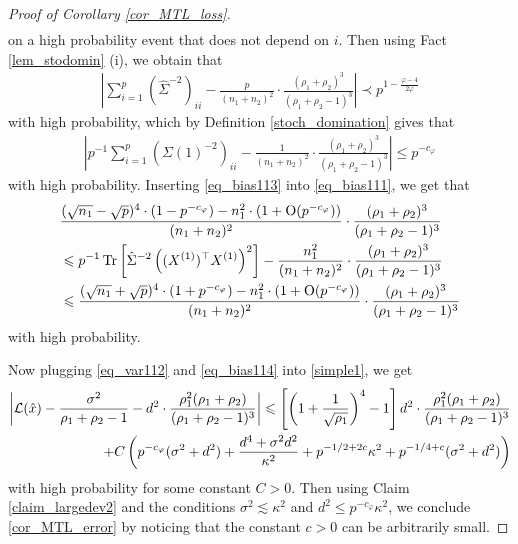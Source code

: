 \begin{proof}[Proof of Corollary \ref{cor_MTL_loss}]
\begin{align*}
\end{align*}
on a high probability event that does not depend on $i$. Then using Fact \ref{lem_stodomin} (i), we obtain that 
\begin{align*} 
\left| \sum_{i=1}^p \left(\hat\Sigma^{-2}\right)_{ii} - \frac{p}{(n_1+n_2)^2}\cdot \frac{(\rho_1+\rho_2)^3}{(\rho_1+\rho_2-1)^3}\right|\prec p^{1-\frac{\varphi-4}{2\varphi}}
\end{align*}
with high probability, which by Definition \ref{stoch_domination} gives that
\begin{align}\label{eq_bias113}
\left| p^{-1}\sum_{i=1}^p \left(\Sigma(1)^{-2}\right)_{ii} - \frac{1}{(n_1+n_2)^2}\cdot \frac{(\rho_1+\rho_2)^3}{(\rho_1+\rho_2-1)^3}\right|\le p^{-c_\varphi}
\end{align}
with high probability. Inserting \eqref{eq_bias113} into \eqref{eq_bias111}, we get that
\begin{align}
& \frac{(\sqrt{n_1}-\sqrt{p})^4 \cdot (1- p^{-c_\varphi}) - n_1^2 \cdot (1+\OO(p^{-c_\varphi}))}{(n_1+n_2)^2}\cdot  \frac{(\rho_1+\rho_2)^3}{(\rho_1+\rho_2-1)^3}\nonumber \\
&\le  {p}^{-1}\tr\left[\hat\Sigma^{-2} \left((X^{(1)})^\top X^{(1)} \right)^2\right] - \frac{n_1^2}{(n_1+n_2)^2}\cdot  \frac{(\rho_1+\rho_2)^3}{(\rho_1+\rho_2-1)^3} \nonumber\\
&  \le \frac{(\sqrt{n_1}+\sqrt{p})^4 \cdot (1+ p^{-c_\varphi}) - n_1^2 \cdot (1+\OO(p^{-c_\varphi}))}{(n_1+n_2)^2}\cdot  \frac{(\rho_1+\rho_2)^3}{(\rho_1+\rho_2-1)^3}\label{eq_bias114}
\end{align}
with high probability. 

Now plugging \eqref{eq_var112} and \eqref{eq_bias114} into \eqref{simple1}, we get
\begin{align}
\left|\cal L(\hat x)- \frac{\sigma^2}{\rho_1+\rho_2-1} - d^2\cdot \frac{\rho_1^2 (\rho_1+\rho_2)}{(\rho_1 + \rho_2 - 1)^3}\right| \le   \left[\left( 1+\frac{1}{\sqrt{\rho_1}}\right)^4-1\right] d^2\cdot \frac{\rho_1^2 (\rho_1+\rho_2)}{(\rho_1 + \rho_2 - 1)^3} \nonumber\\
+C\left( p^{-c_\varphi} (\sigma^2 + d^2)+ \frac{d^4 + \sigma^2 d^2}{\kappa^2}+p^{-1/2+2c}\kappa^2 +  p^{-1/4+c} (\sigma^2 +d^2) \right) \label{simple1add}
\end{align}
with high probability for some constant $C>0$. Then using Claim \ref{claim_largedev2} and the conditions $\sigma^2 \lesssim  \kappa^2$ and $d^2 \le p^{-c_{\varphi}}{\kappa^2}$, we conclude \eqref{cor_MTL_error} by noticing that the constant $c>0$ can be arbitrarily small. %
\end{proof}
